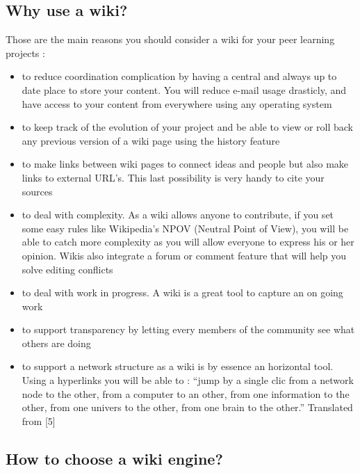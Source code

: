 \subsection{Why use a wiki?}

Those are the main reasons you should consider a wiki for your peer
learning projects :

\begin{itemize}
\item
  to reduce coordination complication by having a central and always up
  to date place to store your content. You will reduce e-mail usage
  drasticly, and have access to your content from everywhere using any
  operating system
\item
  to keep track of the evolution of your project and be able to view or
  roll back any previous version of a wiki page using the history
  feature
\item
  to make links between wiki pages to connect ideas and people but also
  make links to external URL's. This last possibility is very handy to
  cite your sources
\item
  to deal with complexity. As a wiki allows anyone to contribute, if you
  set some easy rules like Wikipedia's NPOV (Neutral Point of View), you
  will be able to catch more complexity as you will allow everyone to
  express his or her opinion. Wikis also integrate a forum or comment
  feature that will help you solve editing conflicts
\item
  to deal with work in progress. A wiki is a great tool to capture an on
  going work
\item
  to support transparency by letting every members of the community see
  what others are doing
\item
  to support a network structure as a wiki is by essence an horizontal
  tool. Using a hyperlinks you will be able to : ``jump by a single clic
  from a network node to the other, from a computer to an other, from
  one information to the other, from one univers to the other, from one
  brain to the other.'' Translated from {[}5{]}
\end{itemize}
\subsection{How to choose a wiki engine?}

